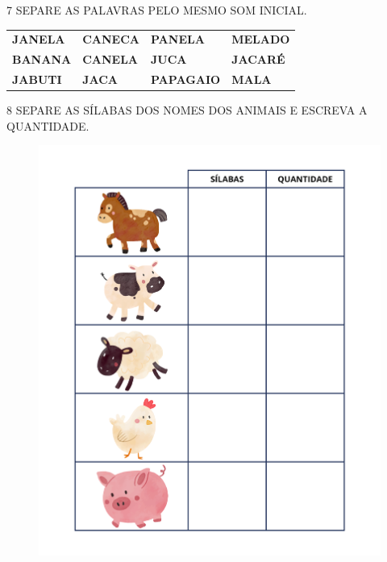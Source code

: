 \num{7} SEPARE AS PALAVRAS PELO MESMO SOM INICIAL.

\begin{longtable}[]{@{}llll@{}}
\toprule
\textbf{JANELA} & \textbf{CANECA} & \textbf{PANELA} &
\textbf{MELADO}\tabularnewline
\textbf{BANANA} & \textbf{CANELA} & \textbf{JUCA} &
\textbf{JACARÉ}\tabularnewline
\textbf{JABUTI} & \textbf{JACA} & \textbf{PAPAGAIO} &
\textbf{MALA}\tabularnewline
\bottomrule
\end{longtable}

\begin{mdframed}[linewidth=2pt,linecolor=salmao,roundcorner=2pt]
\vspace{4cm}
\end{mdframed}

\num{8} SEPARE AS SÍLABAS DOS NOMES DOS ANIMAIS E
ESCREVA A QUANTIDADE. 

\begin{figure}[H]
\centering
\includegraphics[width=\textwidth]{media/image26a28.png}
\end{figure}

